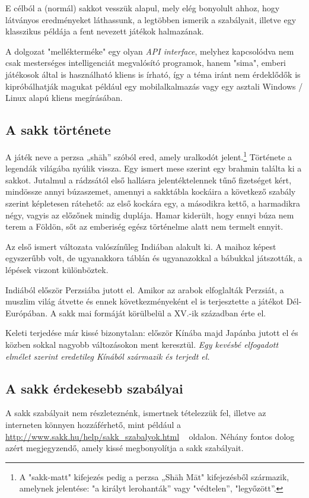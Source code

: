 \documentclass[twoside, a4paper, 12pt]{article}
\begin{document}
E célból a (normál) sakkot vesszük alapul, mely elég bonyolult ahhoz, hogy látványos eredményeket láthassunk, a legtöbben ismerik a szabályait, illetve egy klasszikus példája a fent nevezett játékok halmazának.

A dolgozat "mellékterméke" egy olyan \textit{API interface}, melyhez kapcsolódva nem csak mesterséges intelligenciát megvalósító programok, hanem "sima", emberi játékosok által is használható kliens is írható, így a téma iránt nem érdeklődők is kipróbálhatják magukat például egy mobilalkalmazás vagy egy asztali Windows / Linux alapú kliens megírásában.

\subsection{A sakk története}
A játék neve a perzsa „shāh” szóból ered, amely uralkodót jelent.\footnote{A "sakk-matt" kifejezés pedig a perzsa „Shāh Māt" kifejezésből származik, amelynek jelentése: "a királyt lerohanták” vagy "védtelen”, "legyőzött”.\cite{ChessMateHu}\cite{ChessMateEn}} Története a legendák világába nyúlik vissza. Egy ismert mese szerint egy brahmin találta ki a sakkot. Jutalmul a rádzsától első hallásra jelentéktelennek tűnő fizetséget kért, mindössze annyi búzaszemet, amennyi a sakktábla kockáira a következő szabály szerint képletesen rátehető: az első kockára egy, a másodikra kettő, a harmadikra négy, vagyis az előzőnek mindig duplája. Hamar kiderült, hogy ennyi búza nem terem a Földön, sőt az emberiség egész történelme alatt nem termelt ennyit.

Az első ismert változata valószínűleg Indiában alakult ki. A maihoz képest egyszerűbb volt, de ugyanakkora táblán és ugyanazokkal a bábukkal játszották, a lépések viszont különböztek. 

Indiából először Perzsiába jutott el. Amikor az arabok elfoglalták Perzsiát, a muszlim világ átvette és ennek következményeként el is terjesztette a játékot Dél-Európában. A sakk mai formáját körülbelül a XV.-ik században érte el.

Keleti terjedése már kissé bizonytalan: először Kínába majd Japánba jutott el és közben sokkal nagyobb változásokon ment keresztül.
\textit{Egy kevésbé elfogadott elmélet szerint eredetileg Kínából származik és terjedt el.}\cite{HistoryOfChessHu}\cite{HistoryOfChessEn}

\subsection{A sakk érdekesebb szabályai}
A sakk szabályait nem részleteznénk, ismertnek tételezzük fel, illetve az interneten könnyen hozzáférhető, mint például a \url{http://www.sakk.hu/help/sakk_szabalyok.html} ~\cite{chessrulessakkhu} oldalon. Néhány fontos dolog azért megjegyzendő, amely kissé megbonyolítja a sakk szabályait.
\end{document}
